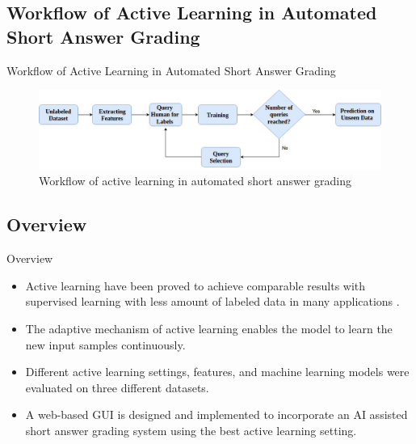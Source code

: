\documentclass{beamer}
\begin{document}
\subsection{Workflow of Active Learning in Automated Short Answer Grading}
\begin{frame}{Workflow of Active Learning in Automated Short Answer Grading}
	\begin{figure}[!htb]
		\centering
		\includegraphics[scale=0.30]{images/AL_workflow}
		\caption{Workflow of active learning in automated short answer grading}
		\label{auto_workflow}
	\end{figure}
\end{frame}

\subsection{Overview}
\begin{frame}{Overview}
	\begin{itemize}
		\item Active learning have been proved to achieve comparable results with supervised learning with less amount of labeled data in many applications \cite{dligach2011} \cite{figueroa2012}.
		\item The adaptive mechanism of active learning enables the model to learn the new input samples continuously.
		\item Different active learning settings, features, and machine learning models were evaluated on three different datasets.
		\item A web-based GUI is designed and implemented to incorporate an AI assisted short answer grading system using the best active learning setting.
	\end{itemize}
\end{frame}

\end{document}
